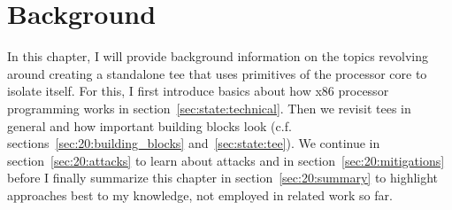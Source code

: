 \chapter{Background}
\label{sec:state}






In this chapter, I will provide background information on the topics revolving
around creating a standalone \gls{tee} that uses primitives of the processor
core to isolate itself. For this, I first introduce basics about how x86
processor programming works in section~\ref{sec:state:technical}. Then we
revisit \glspl{tee} in general and how important building blocks look (c.f.
sections~\ref{sec:20:building_blocks} and~\ref{sec:state:tee}). We continue in
section~\ref{sec:20:attacks} to learn about attacks and in
section~\ref{sec:20:mitigations} before I finally summarize this chapter in
section~\ref{sec:20:summary} to highlight approaches best to my knowledge, not
employed in related work so far.





\cleardoublepage

